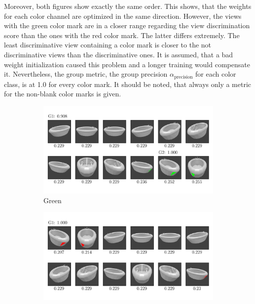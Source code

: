 Moreover, both figures show exactly the same order.
This shows, that the weights for each color channel are optimized in the same direction.
However, the views with the green color mark are in a closer range regarding the view discrimination score than the ones with the red color mark.
The latter differs extremely.
The least discriminative view containing a color mark is closer to the not discriminative views than the discriminative ones.
It is assumed, that a bad weight initialization caused this problem and a longer training would compensate it.
Nevertheless, the group metric, the group precision $\alpha_\text{precision}$ for each color class, is at 1.0 for every color mark.
It should be noted, that always only a metric for the non-blank color marks is given.
\begin{figure}
	\centering
	\begin{subfigure}{\textwidth}
		\includegraphics[trim=10 20 10 20, clip]{images/mn-sl-0-4-20/bathtub_0107_1_grouping.png}
		\caption{Green}
		\label{fig:grouping-0-4-green}
	\end{subfigure}
	\begin{subfigure}{\textwidth}
		\includegraphics[trim=10 20 10 20, clip]{images/mn-sl-0-4-20/bathtub_0107_2_grouping.png}

\end{subfigure}
\end{figure}
